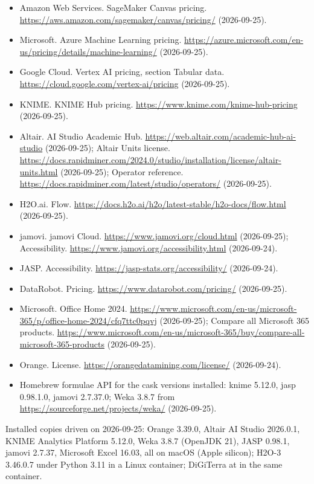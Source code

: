\begin{itemize}
\item Amazon Web Services. SageMaker Canvas pricing. \url{https://aws.amazon.com/sagemaker/canvas/pricing/} (2026-09-25).
\item Microsoft. Azure Machine Learning pricing. \url{https://azure.microsoft.com/en-us/pricing/details/machine-learning/} (2026-09-25).
\item Google Cloud. Vertex AI pricing, section Tabular data. \url{https://cloud.google.com/vertex-ai/pricing} (2026-09-25).
\item KNIME. KNIME Hub pricing. \url{https://www.knime.com/knime-hub-pricing} (2026-09-25).
\item Altair. AI Studio Academic Hub. \url{https://web.altair.com/academic-hub-ai-studio} (2026-09-25); Altair Units license. \url{https://docs.rapidminer.com/2024.0/studio/installation/license/altair-units.html} (2026-09-25); Operator reference. \url{https://docs.rapidminer.com/latest/studio/operators/} (2026-09-25).
\item H2O.ai. Flow. \url{https://docs.h2o.ai/h2o/latest-stable/h2o-docs/flow.html} (2026-09-25).
\item jamovi. jamovi Cloud. \url{https://www.jamovi.org/cloud.html} (2026-09-25); Accessibility. \url{https://www.jamovi.org/accessibility.html} (2026-09-24).
\item JASP. Accessibility. \url{https://jasp-stats.org/accessibility/} (2026-09-24).
\item DataRobot. Pricing. \url{https://www.datarobot.com/pricing/} (2026-09-25).
\item Microsoft. Office Home 2024. \url{https://www.microsoft.com/en-us/microsoft-365/p/office-home-2024/cfq7ttc0pqvj} (2026-09-25); Compare all Microsoft 365 products. \url{https://www.microsoft.com/en-us/microsoft-365/buy/compare-all-microsoft-365-products} (2026-09-25).
\item Orange. License. \url{https://orangedatamining.com/license/} (2026-09-24).
\item Homebrew formulae API for the cask versions installed: knime 5.12.0, jasp 0.98.1.0, jamovi 2.7.37.0; Weka 3.8.7 from \url{https://sourceforge.net/projects/weka/} (2026-09-25).
\end{itemize}

Installed copies driven on 2026-09-25: Orange 3.39.0, Altair AI Studio 2026.0.1, KNIME Analytics Platform 5.12.0, Weka 3.8.7 (OpenJDK 21), JASP 0.98.1, jamovi 2.7.37, Microsoft Excel 16.03, all on macOS (Apple silicon); H2O-3 3.46.0.7 under Python 3.11 in a Linux container; DiGiTerra at  in the same container.

